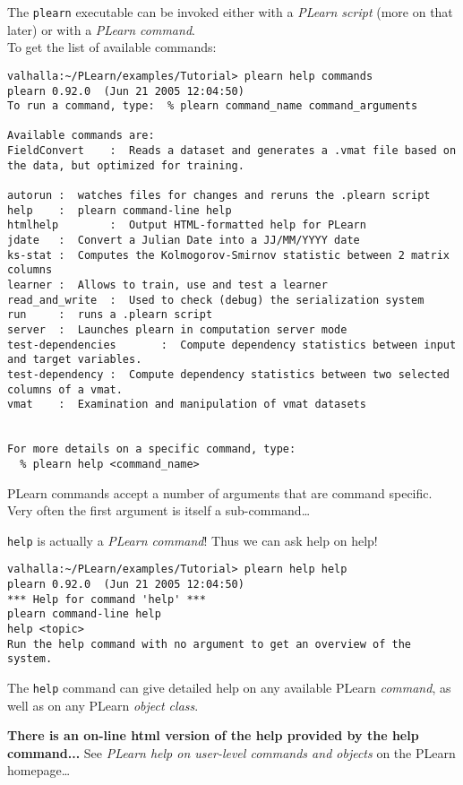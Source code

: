 \documentclass[11pt]{book}
\begin{document}
The {\tt plearn} executable can be invoked either with a {\em PLearn script} (more on that later) or with a {\em PLearn command}.\\
To get the list of available commands:

\begin{verbatim}
valhalla:~/PLearn/examples/Tutorial> plearn help commands
plearn 0.92.0  (Jun 21 2005 12:04:50)
To run a command, type:  % plearn command_name command_arguments

Available commands are:
FieldConvert    :  Reads a dataset and generates a .vmat file based on the data, but optimized for training.

autorun :  watches files for changes and reruns the .plearn script
help    :  plearn command-line help
htmlhelp        :  Output HTML-formatted help for PLearn
jdate   :  Convert a Julian Date into a JJ/MM/YYYY date
ks-stat :  Computes the Kolmogorov-Smirnov statistic between 2 matrix columns
learner :  Allows to train, use and test a learner
read_and_write  :  Used to check (debug) the serialization system
run     :  runs a .plearn script
server  :  Launches plearn in computation server mode
test-dependencies       :  Compute dependency statistics between input and target variables.
test-dependency :  Compute dependency statistics between two selected columns of a vmat.
vmat    :  Examination and manipulation of vmat datasets


For more details on a specific command, type:
  % plearn help <command_name>

\end{verbatim}

PLearn commands accept a number of arguments that are command specific.
Very often the first argument is itself a sub-command\ldots

{\tt help} is actually a {\em PLearn command}! Thus we can ask help on help!

\begin{verbatim}
valhalla:~/PLearn/examples/Tutorial> plearn help help
plearn 0.92.0  (Jun 21 2005 12:04:50)
*** Help for command 'help' ***
plearn command-line help
help <topic>
Run the help command with no argument to get an overview of the system.
\end{verbatim}

The {\tt help} command can give detailed help on any available PLearn {\em
  command}, as well as on any PLearn {\em object class}.

{\bf There is an on-line html version of the help provided by the help command...}
See {\em PLearn help on user-level commands and objects} on the PLearn homepage\ldots
\end{document}

